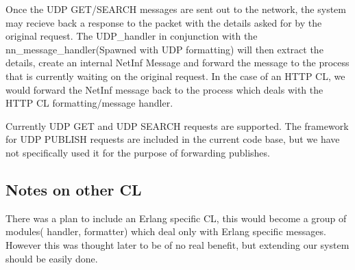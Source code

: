 Once the UDP GET/SEARCH messages are sent out to the network, the system may recieve back a response to the packet with the details asked for by the original request. The UDP\_handler in conjunction with the nn\_message\_handler(Spawned with UDP formatting) will then extract the details, create an internal NetInf Message and forward the message to the process that is currently waiting on the original request. In the case of an HTTP CL, we would forward the NetInf message back to the process which deals with the HTTP CL formatting/message handler.

Currently UDP GET and UDP SEARCH requests are supported. The framework for UDP PUBLISH requests are included in the current code base, but we have not specifically used it for the purpose of forwarding publishes. 

\subsection {Notes on other CL}

There was a plan to include an Erlang specific CL, this would become a group of modules( handler, formatter) which deal only with Erlang specific messages. However this was thought later to be of no real benefit, but extending our system should be easily done. 